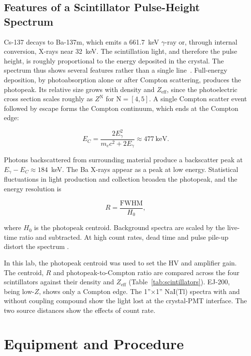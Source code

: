 \documentclass[12pt]{article}
\begin{document}
\subsection{Features of a Scintillator Pulse-Height Spectrum}
\label{subsec:spectrum_features}

Cs-137 decays to Ba-137m, which emits a 661.7~keV $\gamma$-ray or, through internal conversion, X-rays near 32~keV. The scintillation light, and therefore the pulse height, is roughly proportional to the energy deposited in the crystal. The spectrum thus shows several features rather than a single line~\cite{knoll}. Full-energy deposition, by photoabsorption alone or after Compton scattering, produces the photopeak. Its relative size grows with density and $Z_{\mathrm{eff}}$, since the photoelectric cross section scales roughly as $Z^{\text{N}}$ for $\text{N} = [4,5]$. A single Compton scatter event followed by escape forms the Compton continuum, which ends at the Compton edge:

\begin{equation}
    E_C = \frac{2E_\gamma^2}{m_ec^2 + 2E_\gamma} \approx 477~\mathrm{keV}.
    \label{eq:compton_edge}
\end{equation}

Photons backscattered from surrounding material produce a backscatter peak at $E_\gamma - E_C \approx 184$~keV. The Ba X-rays appear as a peak at low energy. Statistical fluctuations in light production and collection broaden the photopeak, and the energy resolution is

\begin{equation}
    R = \frac{\mathrm{FWHM}}{H_0},
    \label{eq:resolution}
\end{equation}

where $H_0$ is the photopeak centroid. Background spectra are scaled by the live-time ratio and subtracted. At high count rates, dead time and pulse pile-up distort the spectrum \cite{knoll}.

In this lab, the photopeak centroid was used to set the HV and amplifier gain. The centroid, $R$ and photopeak-to-Compton ratio are compared across the four scintillators against their density and $Z_{\mathrm{eff}}$ (Table~\ref{tab:scintillators}). EJ-200, being low-$Z$, shows only a Compton edge. The 1''$\times$1'' NaI(Tl) spectra with and without coupling compound show the light lost at the crystal-PMT interface. The two source distances show the effects of count rate.

\section{Equipment and Procedure}
\end{document}
